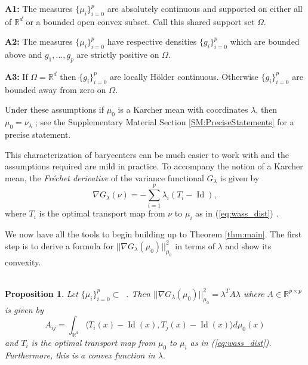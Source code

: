 \documentclass[nohyperref]{article}
\DeclareMathOperator*{\id}{Id}
\DeclareMathOperator{\Pac}{\mathcal{P}_{2,ac}(\mathbb{R}^d)}
\newtheorem{proposition}{Proposition}
\theoremstyle{definition}
\begin{document}
\textbf{A1:}\,\,The measures $\{\mu_i\}_{i=0}^p$ are absolutely continuous and supported on either all of $\mathbb{R}^d$ or a bounded open convex subset. Call this shared support set $\Omega$.

\textbf{A2:}\,\,The measures $\{\mu_i\}_{i=0}^p$ have respective densities $\{g_i\}_{i=0}^p$ which are bounded above and $g_1,...,g_p$ are strictly positive on $\Omega$.

\textbf{A3:}\,\,If $\Omega = \mathbb{R}^d$ then $\{g_i\}_{i=0}^p$ are locally H\"older continuous. Otherwise $\{g_i\}_{i=0}^p$ are bounded away from zero on $\Omega$.


Under these assumptions if $\mu_0$ is a Karcher mean with coordinates $\lambda$, then $\mu_0 = \nu_{\lambda}$ \citep{panaretos2020invitation}; see the Supplementary Material Section \ref{SM:PreciseStatements} for a precise statement.

This characterization of barycenters can be much easier to work with and the assumptions required are mild in practice.  To accompany the notion of a Karcher mean, the \emph{Fr\'{e}chet derivative} \citep{frechet1948elements} of the variance functional $G_{\lambda}$ is given by
\begin{equation} \label{eq:grad}
    \nabla G_{\lambda}(\nu) = -\sum_{i=1}^p \lambda_i \left ( T_i - \id \right ),
\end{equation} where $T_i$ is the optimal transport map from $\nu$ to $\mu_i$ as in (\ref{eq:wass_dist}) \citep{ambrosio2005gradient, panaretos2020invitation}.

We now have all the tools to begin building up to Theorem \ref{thm:main}. The first step is to derive a formula for $||\nabla G_{\lambda}(\mu_0)||_{\mu_0}^2$ in terms of $\lambda$ and show its convexity. 
\\
\\
\begin{proposition}\label{prop:Prop1}
    Let $\{\mu_i\}_{i=0}^p \subset \Pac$. Then 
    $||\nabla G_{\lambda}(\mu_0)||_{\mu_0}^2 = \lambda^TA\lambda$ where $A \in \mathbb{R}^{p \times p}$ is given by 
    \begin{equation} \label{eq:A_ij}
        A_{ij} = \int_{\mathbb{R}^d} \langle T_i(x) - \id(x), T_j(x) - \id(x) \rangle d\mu_0(x)
    \end{equation}
    and $T_i$ is the optimal transport map from $\mu_0$ to $\mu_i$ as in (\ref{eq:wass_dist}). Furthermore, this is a convex function in $\lambda$.
\end{proposition}
\end{document}
